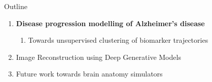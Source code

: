\documentclass[8pt,xcolor=table,aspectratio=169]{beamer}
\begin{document}
\begin{frame}{Outline}

\begin{enumerate}
 \item \textbf{Disease progression modelling of Alzheimer's disease}
 \begin{enumerate} 
  \item Towards unsupervised clustering of biomarker trajectories\\
 \end{enumerate}
   
 
  
  \vt

 \item Image Reconstruction using Deep Generative Models\\
\brgmoursshort
\vt
 
  \item Future work towards brain anatomy simulators\\


\end{enumerate}
\end{frame}


\end{document}
